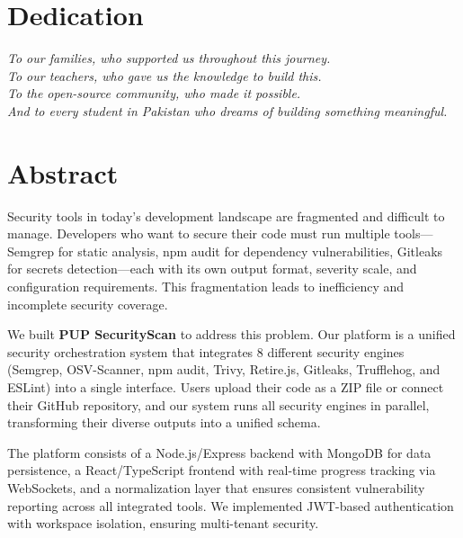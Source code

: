 \documentclass[12pt,a4paper]{report}
\begin{document}
\chapter*{Dedication}

\vspace*{3cm}
\begin{center}
\textit{To our families, who supported us throughout this journey.\\
To our teachers, who gave us the knowledge to build this.\\
To the open-source community, who made it possible.\\
And to every student in Pakistan who dreams of building something meaningful.}
\end{center}

\chapter*{Abstract}

Security tools in today's development landscape are fragmented and difficult to manage. Developers who want to secure their code must run multiple tools---Semgrep for static analysis, npm audit for dependency vulnerabilities, Gitleaks for secrets detection---each with its own output format, severity scale, and configuration requirements. This fragmentation leads to inefficiency and incomplete security coverage.

We built \textbf{PUP SecurityScan} to address this problem. Our platform is a unified security orchestration system that integrates 8 different security engines (Semgrep, OSV-Scanner, npm audit, Trivy, Retire.js, Gitleaks, Trufflehog, and ESLint) into a single interface. Users upload their code as a ZIP file or connect their GitHub repository, and our system runs all security engines in parallel, transforming their diverse outputs into a unified schema.

The platform consists of a Node.js/Express backend with MongoDB for data persistence, a React/TypeScript frontend with real-time progress tracking via WebSockets, and a normalization layer that ensures consistent vulnerability reporting across all integrated tools. We implemented JWT-based authentication with workspace isolation, ensuring multi-tenant security.
\end{document}
